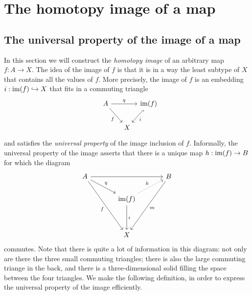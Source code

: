 \section{The homotopy image of a map}\label{chap:image}

\subsection{The universal property of the image of a map}
In this section we will construct the \emph{homotopy image} of an arbitrary map $f:A\to X$. The idea of the image of $f$ is that it is in a way the least subtype of $X$ that contains all the values of $f$. More precisely, the image of $f$ is an embedding $i:\operatorname{im}(f)\hookrightarrow X$ that fits in a commuting triangle
\begin{equation*}
  \begin{tikzcd}[column sep=tiny]
    A \arrow[rr,"q"] \arrow[dr,swap,"f"] & & \im(f) \arrow[dl,hook,"i"] \\
    \phantom{\im(f)} & X
  \end{tikzcd}
\end{equation*}
and satisfies the \emph{universal property} of the image inclusion of $f$. Informally, the universal property of the image asserts that there is a unique map $h:\operatorname{im}(f)\to B$ for which the diagram
\begin{equation*}
  \begin{tikzcd}[column sep=large]
    A \arrow[rr] \arrow[dr,"q"] \arrow[dddr,swap,"f"] & & B \arrow[dddl,"m"] \\
    & \im(f) \arrow[ur,densely dotted,"h"] \arrow[dd,"i"] \\ \\
    & X
  \end{tikzcd}
\end{equation*}
commutes. Note that there is quite a lot of information in this diagram: not only are there the three small commuting triangles; there is also the large commuting triange in the back, and there is a three-dimensional solid filling the space between the four triangles. We make the following definition, in order to express the universal property of the image efficiently.

